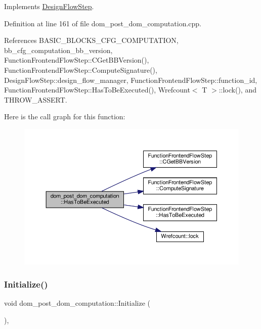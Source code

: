 Implements \hyperlink{classDesignFlowStep_a1783abe0c1d162a52da1e413d5d1ef05}{Design\+Flow\+Step}.



Definition at line 161 of file dom\+\_\+post\+\_\+dom\+\_\+computation.\+cpp.



References B\+A\+S\+I\+C\+\_\+\+B\+L\+O\+C\+K\+S\+\_\+\+C\+F\+G\+\_\+\+C\+O\+M\+P\+U\+T\+A\+T\+I\+ON, bb\+\_\+cfg\+\_\+computation\+\_\+bb\+\_\+version, Function\+Frontend\+Flow\+Step\+::\+C\+Get\+B\+B\+Version(), Function\+Frontend\+Flow\+Step\+::\+Compute\+Signature(), Design\+Flow\+Step\+::design\+\_\+flow\+\_\+manager, Function\+Frontend\+Flow\+Step\+::function\+\_\+id, Function\+Frontend\+Flow\+Step\+::\+Has\+To\+Be\+Executed(), Wrefcount$<$ T $>$\+::lock(), and T\+H\+R\+O\+W\+\_\+\+A\+S\+S\+E\+RT.

Here is the call graph for this function\+:
\nopagebreak
\begin{figure}[H]
\begin{center}
\leavevmode
\includegraphics[width=350pt]{db/d28/classdom__post__dom__computation_a4b744602d67b99a29be3a61b769bad7a_cgraph}
\end{center}
\end{figure}
\mbox{\label{classdom__post__dom__computation_a6ee3cd25445edae2d45bf4a77564f11f}} 
\subsubsection{\texorpdfstring{Initialize()}{Initialize()}}
{\footnotesize\ttfamily void dom\+\_\+post\+\_\+dom\+\_\+computation\+::\+Initialize (\begin{DoxyParamCaption}{ }\end{DoxyParamCaption})\hspace{0.3cm}{\ttfamily [override]}, {\ttfamily [virtual]}}




